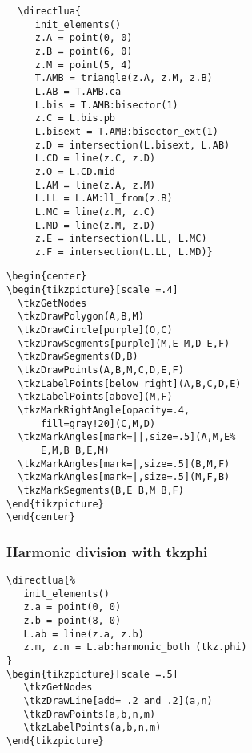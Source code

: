 \begin{minipage}{.5\textwidth}
  \begin{verbatim}
  \directlua{
     init_elements()
     z.A = point(0, 0)
     z.B = point(6, 0)
     z.M = point(5, 4)
     T.AMB = triangle(z.A, z.M, z.B)
     L.AB = T.AMB.ca
     L.bis = T.AMB:bisector(1)
     z.C = L.bis.pb
     L.bisext = T.AMB:bisector_ext(1)
     z.D = intersection(L.bisext, L.AB)
     L.CD = line(z.C, z.D)
     z.O = L.CD.mid
     L.AM = line(z.A, z.M)
     L.LL = L.AM:ll_from(z.B)
     L.MC = line(z.M, z.C)
     L.MD = line(z.M, z.D)
     z.E = intersection(L.LL, L.MC)
     z.F = intersection(L.LL, L.MD)}
  \end{verbatim}
\end{minipage}
\begin{minipage}{.5\textwidth}
\begin{verbatim}
\begin{center}
\begin{tikzpicture}[scale =.4]
  \tkzGetNodes
  \tkzDrawPolygon(A,B,M)
  \tkzDrawCircle[purple](O,C)
  \tkzDrawSegments[purple](M,E M,D E,F)
  \tkzDrawSegments(D,B)
  \tkzDrawPoints(A,B,M,C,D,E,F)
  \tkzLabelPoints[below right](A,B,C,D,E)
  \tkzLabelPoints[above](M,F)
  \tkzMarkRightAngle[opacity=.4,
      fill=gray!20](C,M,D)
  \tkzMarkAngles[mark=||,size=.5](A,M,E%
      E,M,B B,E,M)
  \tkzMarkAngles[mark=|,size=.5](B,M,F)
  \tkzMarkAngles[mark=|,size=.5](M,F,B)
  \tkzMarkSegments(B,E B,M B,F)
\end{tikzpicture}
\end{center}
\end{verbatim}
\end{minipage}

\subsubsection{Harmonic division with tkzphi }
\label{ssub:harmonic_division_with_tkzphi}

\begin{Verbatim}
\directlua{%
   init_elements()
   z.a = point(0, 0)
   z.b = point(8, 0)
   L.ab = line(z.a, z.b)
   z.m, z.n = L.ab:harmonic_both (tkz.phi)
}
\begin{tikzpicture}[scale =.5]
   \tkzGetNodes
   \tkzDrawLine[add= .2 and .2](a,n)
   \tkzDrawPoints(a,b,n,m)
   \tkzLabelPoints(a,b,n,m)
\end{tikzpicture}
\end{Verbatim}



